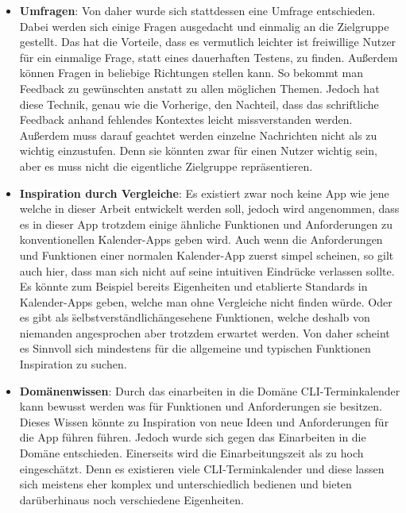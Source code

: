 \begin{itemize}
	\item \textbf{Umfragen}: %
	Von daher wurde sich stattdessen eine Umfrage entschieden. Dabei werden sich einige Fragen ausgedacht und einmalig an die Zielgruppe gestellt. %
	Das hat die Vorteile, dass es vermutlich leichter ist freiwillige Nutzer für ein einmalige Frage, statt eines dauerhaften Testens, zu finden. %
	Außerdem können Fragen in beliebige Richtungen stellen kann. So bekommt man Feedback zu gewünschten anstatt zu allen möglichen Themen. %
	Jedoch hat diese Technik, genau wie die Vorherige, den Nachteil, dass das schriftliche Feedback anhand fehlendes Kontextes leicht missverstanden werden. %
	Außerdem muss darauf geachtet werden einzelne Nachrichten nicht als zu wichtig einzustufen. Denn sie könnten zwar für einen Nutzer wichtig sein, aber es muss nicht die eigentliche Zielgruppe repräsentieren.%
	\item \textbf{Inspiration durch Vergleiche}: %
		Es existiert zwar noch keine App wie jene welche in dieser Arbeit entwickelt werden soll, jedoch wird angenommen, dass es in dieser App trotzdem einige ähnliche Funktionen und Anforderungen zu konventionellen Kalender-Apps geben wird. %
		Auch wenn die Anforderungen und Funktionen einer normalen Kalender-App zuerst simpel scheinen, so gilt auch hier, dass man sich nicht auf seine intuitiven Eindrücke verlassen sollte. %
			Es könnte zum Beispiel bereits Eigenheiten und etablierte Standards in Kalender-Apps geben, welche man ohne Vergleiche nicht finden würde. Oder es gibt als \"selbstverständlich\" angesehene Funktionen, welche deshalb von niemanden angesprochen aber trotzdem erwartet werden. %
		Von daher scheint es Sinnvoll sich mindestens für die allgemeine und typischen Funktionen Inspiration zu suchen.%
	\item \textbf{Domänenwissen}: %
		Durch das einarbeiten in die Domäne CLI-Terminkalender kann bewusst werden was für Funktionen und Anforderungen sie besitzen. %
		Dieses Wissen könnte zu Inspiration von neue Ideen und Anforderungen für die App führen führen. %
		Jedoch wurde sich gegen das Einarbeiten in die Domäne entschieden. %
			Einerseits wird die Einarbeitungszeit als zu hoch eingeschätzt. Denn es existieren viele CLI-Terminkalender und diese lassen sich meistens eher komplex und unterschiedlich bedienen und bieten darüberhinaus noch verschiedene Eigenheiten. %

\end{itemize}
